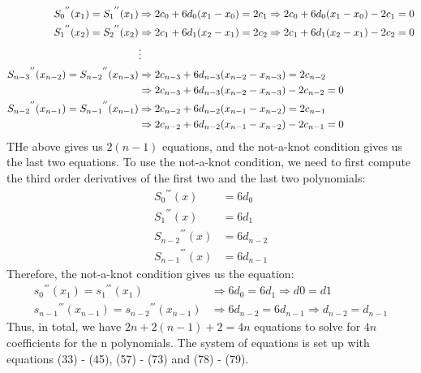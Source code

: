 \begin{answer}
\begin{align}
        &\newline\\
        {S_0}^{''}(x_1) = {S_1}^{''}(x_1) &\Rightarrow 2c_0 + 6d_0(x_1-x_0) = 2c_1 \Rightarrow 2c_0 + 6d_0(x_1-x_0) - 2c_1 = 0\\
        {S_1}^{''}(x_2) = {S_2}^{''}(x_2) &\Rightarrow 2c_1 + 6d_1(x_2-x_1) = 2c_2 \Rightarrow 2c_1 + 6d_1(x_2-x_1) - 2c_2 = 0\\
        &\vdots\\
        {S_{n-3}}^{''}(x_{n-2}) = {S_{n-2}}^{''}(x_{n-3}) &\Rightarrow 2c_{n-3} + 6d_{n-3}(x_{n-2}-x_{n-3}) = 2c_{n-2}\\
        &\Rightarrow 2c_{n-3} + 6d_{n-3}(x_{n-2}-x_{n-3}) - 2c_{n-2} = 0\\
        {S_{n-2}}^{''}(x_{n-1}) = {S_{n-1}}^{''}(x_{n-1}) &\Rightarrow 2c_{n-2} + 6d_{n-2}(x_{n-1}-x_{n-2}) = 2c_{n-1}\\
        &\Rightarrow 2c_{n-2} + 6d_{n-2}(x_{n-1}-x_{n-2}) - 2c_{n-1} = 0
    \end{align}
    THe above gives us $2(n-1)$ equations, and the not-a-knot condition gives us the last two equations. To use the not-a-knot condition, we need to first compute the third order derivatives of the first two and the last two polynomials:
    \begin{align}
        {S_0}^{'''}(x) &= 6d_0\\
        {S_1}^{'''}(x) &= 6d_1\\
        {S_{n-2}}^{'''}(x) &= 6d_{n-2}\\
        {S_{n-1}}^{'''}(x) &= 6d_{n-1}
    \end{align}
    Therefore, the not-a-knot condition gives us the equation:
    \begin{align}
        {s_0}^{'''}(x_1) = {s_1}^{'''}(x_1) &\Rightarrow 6d_0 = 6d_1 \Rightarrow d0 = d1\\
        {s_{n-1}}^{'''}(x_{n-1}) = {s_{n-2}}^{'''}(x_{n-1}) &\Rightarrow 6d_{n-2} = 6d_{n-1} \Rightarrow d_{n-2} = d_{n-1}
    \end{align}
    Thus, in total, we have $2n + 2(n-1) + 2 = 4n$ equations to solve for $4n$ coefficients for the n polynomials. The system of equations is set up with equations (33) - (45), (57) - (73) and (78) - (79).
\end{answer}